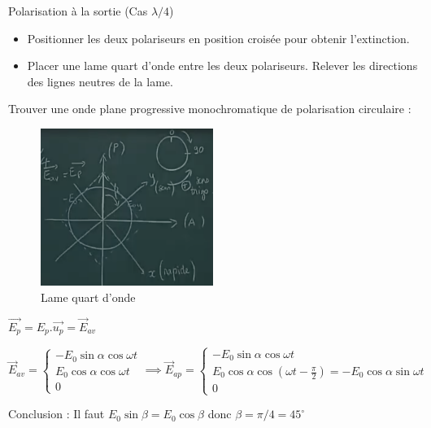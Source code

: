 \begin{Example}{Polarisation à la sortie (Cas $\lambda/4$)}{}
  \begin{itemize}

      \item Positionner les deux polariseurs en position croisée pour obtenir l’extinction.
      \item Placer une lame quart d’onde entre les deux polariseurs. Relever les directions des lignes neutres de la lame.

  \end{itemize}
  Trouver une onde plane progressive monochromatique de polarisation circulaire :
\begin{figure}[H] %
  \centering
  \includegraphics[width=0.5\textwidth]{./assets/Lame quart d'onde.png}
  \caption{Lame quart d'onde}
  \label{fig:Lame quart d'onde}
\end{figure}

$\overrightarrow{E_p} = E_p .\overrightarrow{u_p} = \overrightarrow{E} _{av}$ 

\begin{equation}
  \overrightarrow{E} _{av} = \begin{cases}
    - E_0 \sin \alpha \cos \omega t \\ 
    E_0 \cos \alpha \cos \omega t \\ 
    0
  \end{cases} \implies 
  \overrightarrow{E} _{ap} = \begin{cases}
    - E_0 \sin \alpha \cos \omega t \\ 
    E_0 \cos \alpha  \cos \left(\omega t - \frac{\pi}{2} \right)  = - E_0 \cos \alpha \sin \omega t\\ 
    0
  \end{cases}
\end{equation}

\end{Example}
Conclusion : Il faut $E_0 \sin \beta = E_0 \cos \beta$ donc $\beta = \pi /4 = 45 ^{\circ}$

